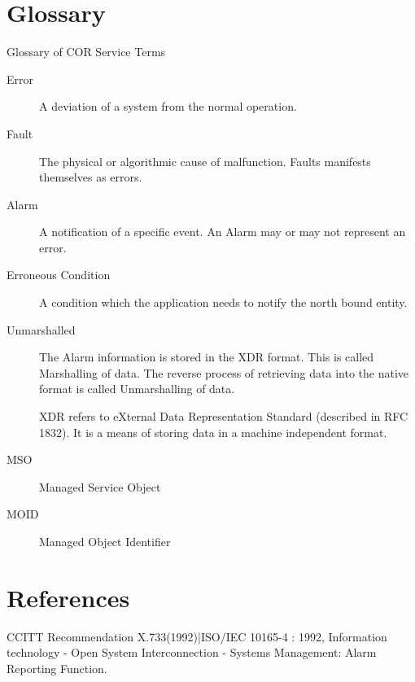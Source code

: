 \begin{flushleft}
\chapter*{Glossary}
\begin{Desc}
\item[Glossary of COR Service Terms]
\end{Desc}

\begin{description}
\item[Error] A deviation of a system from the normal operation.
\end{description}

\begin{description}
\item[Fault] The physical or algorithmic cause of malfunction. Faults manifests themselves as errors. 
\end{description}

\begin{description}
\item[Alarm] A notification of a specific event. An Alarm may or may not represent an error.
\end{description}

\begin{description}
\item[Erroneous Condition] A condition which the application needs to notify the north bound entity.
\end{description}


\begin{description}
\item[Unmarshalled]
The Alarm information is stored in the XDR format. This is called Marshalling of data. The reverse process of retrieving data into the 
native format is called Unmarshalling of data. 
\par 
XDR refers to eXternal Data Representation Standard (described in RFC 1832). It is a means of storing 
data in a machine independent format.
\end{description}

\begin{description}
\item[MSO] Managed Service Object
	\end{description}

\begin{description}
\item[MOID]		Managed Object Identifier
	\end{description}



\chapter*{References}
CCITT Recommendation X.733(1992)|ISO/IEC 10165-4 : 1992, Information technology - Open System Interconnection - Systems Management: Alarm Reporting 
Function.


\end{flushleft}


